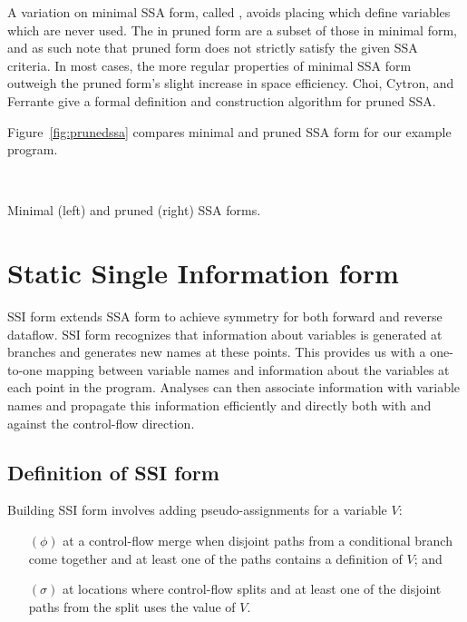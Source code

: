 \documentclass[12pt,titlepage,twoside]{article}
\let\oldsection\section
\renewcommand{\section}{\setcounter{figure}{0}\setcounter{table}{0}\oldsection}
\begin{document}
A variation
on minimal SSA form, called ,
avoids placing  which define variables which are never used.
The  in pruned form are a subset of those in minimal
form, and as such note that pruned form does not strictly satisfy the
given SSA criteria.
In most cases, the more regular properties of minimal SSA form
outweigh the pruned form's slight increase in space efficiency.
Choi, Cytron, and Ferrante \cite{ferrante91:pruned} give a formal
definition and construction algorithm for pruned SSA.

Figure~\vref{fig:prunedssa} compares minimal and pruned SSA form for
our example program.
\begin{myfigure}
\begin{center}
 \vline\ 
\end{center}
\caption[Minimal and pruned SSA forms.]
{Minimal (left) and pruned (right) SSA forms.}
\label{fig:prunedssa}
\end{myfigure}

\section{Static Single Information form}\label{sec:ssi}

SSI form extends SSA form to achieve symmetry for both forward and
reverse dataflow.   SSI form recognizes that information about
variables is generated at branches and generates new names at these
points.  This provides us with a one-to-one mapping between variable
names and information about the variables at each point in the program.
Analyses can then associate information
with variable names and propagate this information efficiently and
directly both with and against the control-flow direction.

\subsection{Definition of SSI form}\label{sec:ssidef}
Building SSI form involves adding pseudo-assignments for a variable $V$:
\begin{enumerate}
\item[$(\phi)$] at a control-flow merge when disjoint paths from a
conditional branch come together and at least one of the paths
contains a definition of $V$; and
\item[$(\sigma)$] at locations where control-flow splits and at least
one of the disjoint paths from the split uses the value of $V$.
\end{enumerate}
\end{document}
